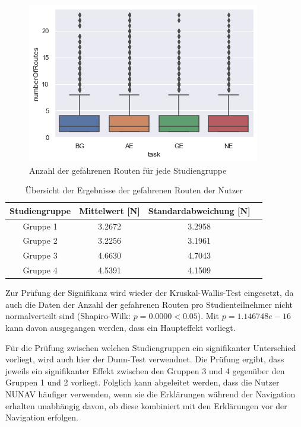 \begin{figure}
    \centering
    \includegraphics{contents/06_model_evaluation/res/Usage_Result_Overview.png}
    \caption{Anzahl der gefahrenen Routen für jede Studiengruppe}
\end{figure}

\begin{table}
    \centering
    \begin{tabular}{|c|c|c|c|}
        \hline
        \textbf{Studiengruppe}  & \textbf{Mittelwert} [N] & \textbf{Standardabweichung} [N] \\ \hline
        Gruppe 1                & 3.2672 & 3.2958 \\ \hline
        Gruppe 2                & 3.2256 & 3.1961 \\ \hline
        Gruppe 3                & 4.6630 & 4.7043 \\ \hline
        Gruppe 4                & 4.5391 & 4.1509 \\ \hline
    \end{tabular}
    \caption{Übersicht der Ergebnisse der gefahrenen Routen der Nutzer}
    \label{tab:study_offroute_results_2}
\end{table}

Zur Prüfung der Signifikanz wird wieder der Kruskal-Wallis-Test eingesetzt, da auch die Daten der Anzahl der gefahrenen Routen pro Studienteilnehmer nicht normalverteilt sind (Shapiro-Wilk: $ p = 0.0000 < 0.05 $). Mit $ p = 1.146748e-16 $ kann davon ausgegangen werden, dass ein Haupteffekt vorliegt.

Für die Prüfung zwischen welchen Studiengruppen ein signifikanter Unterschied vorliegt, wird auch hier der Dunn-Test verwendnet. Die Prüfung ergibt, dass jeweils ein signifikanter Effekt zwischen den Gruppen 3 und 4 gegenüber den Gruppen 1 und 2 vorliegt. Folglich kann abgeleitet werden, dass die Nutzer NUNAV häufiger verwenden, wenn sie die Erklärungen während der Navigation erhalten unabhängig davon, ob diese kombiniert mit den Erklärungen vor der Navigation erfolgen.

